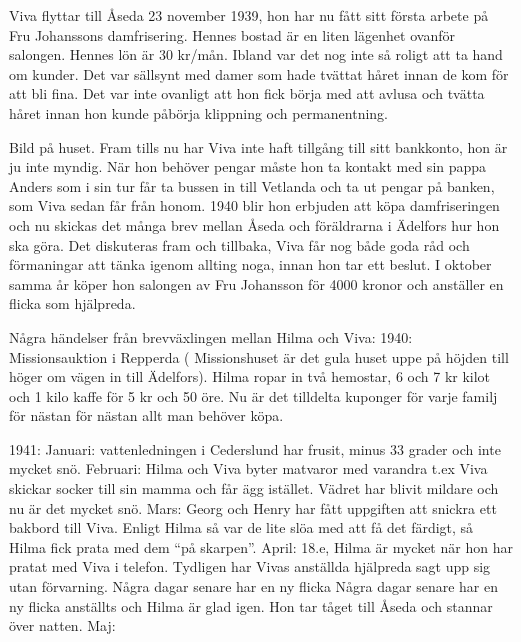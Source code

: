 Viva flyttar till Åseda 23 november 1939, hon har nu fått sitt första arbete på Fru Johanssons damfrisering. Hennes bostad är en liten lägenhet ovanför salongen. Hennes lön är 30 kr/mån.
Ibland var det nog inte så roligt att ta hand om kunder. Det var sällsynt med damer som hade tvättat håret innan de kom för att bli fina. Det var inte ovanligt att hon fick börja med att avlusa och tvätta håret innan hon kunde påbörja klippning och permanentning.


Bild på huset.
 Fram tills nu har Viva inte haft tillgång till sitt bankkonto, hon är ju inte myndig. När hon behöver pengar måste hon ta kontakt med sin pappa Anders som i sin tur får ta bussen in till Vetlanda och ta ut pengar på banken, som Viva sedan får från honom.
1940 blir hon erbjuden att köpa damfriseringen och nu skickas det många brev mellan Åseda och föräldrarna i Ädelfors hur hon ska göra. Det diskuteras fram och tillbaka, Viva får nog både goda råd och förmaningar att tänka igenom allting noga, innan hon tar ett beslut.
I oktober samma år köper hon salongen av Fru Johansson för 4000 kronor och anställer en flicka som hjälpreda.


Några händelser från brevväxlingen mellan Hilma och Viva:
1940: Missionsauktion i Repperda ( Missionshuset är det gula huset uppe på höjden till höger om vägen in till Ädelfors). Hilma ropar in två hemostar, 6 och 7 kr kilot och 1 kilo kaffe för 5 kr och 50 öre. 
Nu är det tilldelta kuponger för varje familj för nästan för nästan allt man behöver köpa.


1941: Januari: vattenledningen i Cederslund har frusit, minus 33 grader och inte mycket snö.
          Februari: Hilma och Viva byter matvaror med varandra t.ex Viva skickar socker till sin 
          mamma och får ägg istället.
          Vädret har blivit mildare och nu är det mycket snö.
          Mars: Georg och Henry har fått uppgiften att snickra ett bakbord till Viva. Enligt Hilma så 
          var de lite slöa med att få det färdigt, så Hilma fick prata med dem “på skarpen”.
          April: 18.e, Hilma är mycket när hon har pratat med Viva i telefon. Tydligen har Vivas 
          anställda hjälpreda sagt upp sig utan förvarning. Några dagar senare har en ny flicka  
          Några dagar senare har en ny flicka anställts och Hilma är glad igen. Hon tar tåget till 
          Åseda och stannar över natten.
          Maj:










